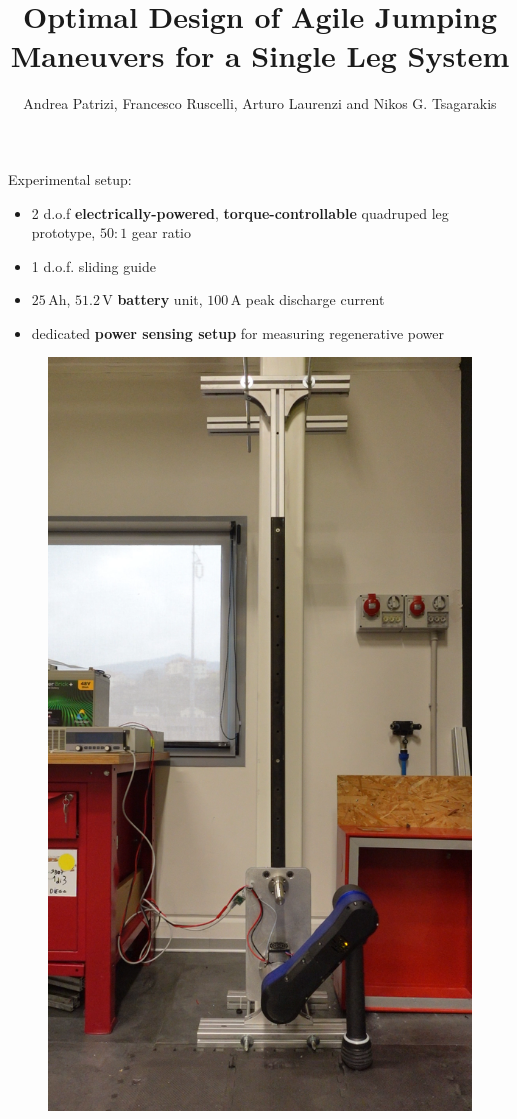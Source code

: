 \documentclass[aspectratio=169]{beamer}
\title{\vspace{0.5cm}\Large Optimal Design of Agile Jumping Maneuvers for a Single Leg System}
\subtitle{\small  Andrea Patrizi, Francesco Ruscelli, Arturo Laurenzi and Nikos G. Tsagarakis \vspace{1cm}}
\institute{Istituto Italiano di Tecnologia}
\begin{document}
\titleframe



\begin{frame}
\begin{multicols}{2}
\vfill\null
Experimental setup: 
\begin{itemize}
\item 2 d.o.f \textbf{electrically-powered}, \textbf{torque-controllable} quadruped leg prototype, $50:1$ gear ratio
\item 1 d.o.f. sliding guide
\item $25\,\mathrm{Ah}$, $51.2\,\mathrm{V}$ \textbf{battery} unit, $100\,\mathrm{A}$ peak discharge current
\item dedicated \textbf{power sensing setup} for measuring regenerative power
\end{itemize}
\vfill\null
\columnbreak
\vfill\null
\vspace{0.5cm}
\begin{figure}
    \centering
    \includegraphics[width=0.5\columnwidth]{beamer_imgs/jump_sequence_intro_image/real1.png}
\end{figure}
\end{multicols}
\end{frame}
\end{document}

